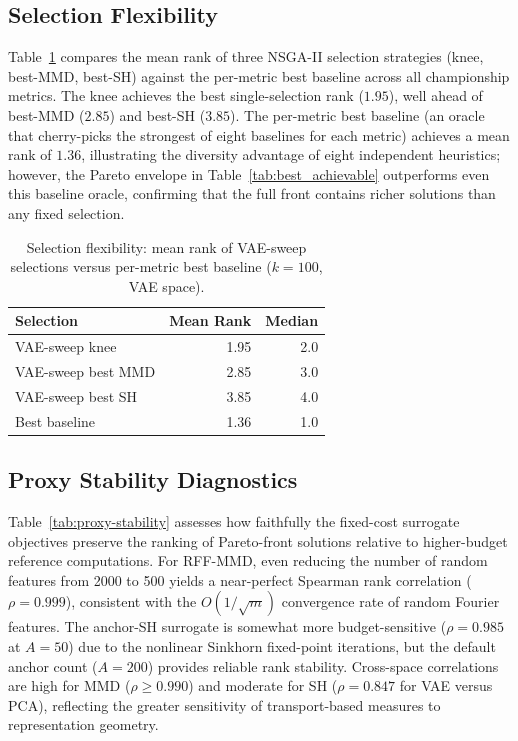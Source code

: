 \documentclass[10pt,journal]{IEEEtran}
\newcommand{\1}{\mathbf{1}}
\theoremstyle{ieeethm}
\begin{document}
\subsection{Selection Flexibility}

Table~\ref{tab:selection_strategies} compares the mean rank of three NSGA-II selection strategies (knee, best-MMD, best-SH) against the per-metric best baseline across all championship metrics. The knee achieves the best single-selection rank ($1.95$), well ahead of best-MMD ($2.85$) and best-SH ($3.85$). The per-metric best baseline (an oracle that cherry-picks the strongest of eight baselines for each metric) achieves a mean rank of $1.36$, illustrating the diversity advantage of eight independent heuristics; however, the Pareto envelope in Table~\ref{tab:best_achievable} outperforms even this baseline oracle, confirming that the full front contains richer solutions than any fixed selection.

\begin{table}[h]
\centering
\caption{Selection flexibility: mean rank of VAE-sweep selections versus per-metric best baseline ($k=100$, VAE space).}
\label{tab:selection_strategies}
\small
\begin{tabular}{@{}l r r@{}}
\toprule
Selection & Mean Rank & Median \\
\midrule
VAE-sweep knee      & 1.95 & 2.0 \\
VAE-sweep best MMD  & 2.85 & 3.0 \\
VAE-sweep best SH   & 3.85 & 4.0 \\
Best baseline       & 1.36 & 1.0 \\
\bottomrule
\end{tabular}
\end{table}

\subsection{Proxy Stability Diagnostics}

Table~\ref{tab:proxy-stability} assesses how faithfully the fixed-cost surrogate objectives preserve the ranking of Pareto-front solutions relative to higher-budget reference computations. For RFF-MMD, even reducing the number of random features from 2000 to 500 yields a near-perfect Spearman rank correlation ($\rho{=}0.999$), consistent with the $O(1/\sqrt{m})$ convergence rate of random Fourier features. The anchor-SH surrogate is somewhat more budget-sensitive ($\rho{=}0.985$ at $A{=}50$) due to the nonlinear Sinkhorn fixed-point iterations, but the default anchor count ($A{=}200$) provides reliable rank stability. Cross-space correlations are high for MMD ($\rho \ge 0.990$) and moderate for SH ($\rho{=}0.847$ for VAE versus PCA), reflecting the greater sensitivity of transport-based measures to representation geometry.
\end{document}
